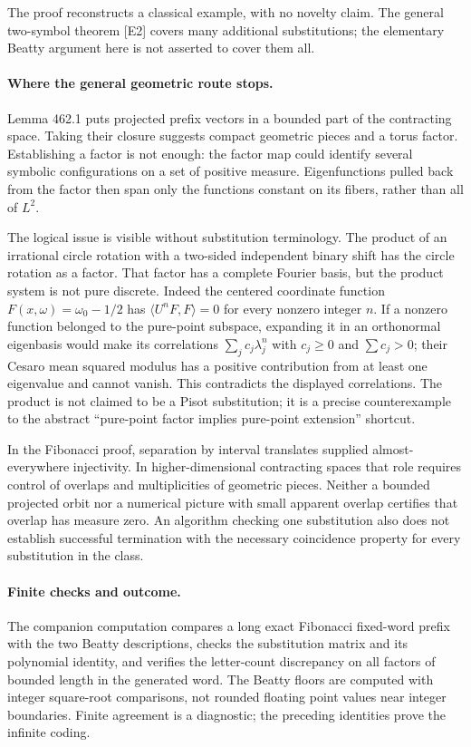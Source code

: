 \documentclass[11pt]{article}
\begin{document}
The proof reconstructs a classical example, with no novelty claim. The
general two-symbol theorem [E2] covers many additional substitutions;
the elementary Beatty argument here is not asserted to cover them all.

\paragraph{Where the general geometric route stops.}
Lemma 462.1 puts projected prefix vectors in a bounded part of the
contracting space. Taking their closure suggests compact geometric pieces
and a torus factor. Establishing a factor is not enough: the factor map
could identify several symbolic configurations on a set of positive
measure. Eigenfunctions pulled back from the factor then span only the
functions constant on its fibers, rather than all of $L^2$.

The logical issue is visible without substitution terminology. The product
of an irrational circle rotation with a two-sided independent binary shift
has the circle rotation as a factor. That factor has a complete Fourier
basis, but the product system is not pure discrete. Indeed the centered
coordinate function $F(x,\omega)=\omega_0-1/2$ has
$\langle U^nF,F\rangle=0$ for every nonzero integer $n$. If a nonzero
function belonged to the pure-point subspace, expanding it in an
orthonormal eigenbasis would make its correlations
$\sum_j c_j\lambda_j^n$ with $c_j\ge0$ and $\sum c_j>0$; their
Cesaro mean squared modulus has a positive contribution from at least
one eigenvalue and cannot vanish. This contradicts the displayed
correlations. The product is not claimed to be a Pisot substitution;
it is a precise counterexample to the abstract ``pure-point factor implies
pure-point extension'' shortcut.

In the Fibonacci proof, separation by interval translates supplied almost-everywhere
injectivity. In higher-dimensional contracting spaces that role requires
control of overlaps and multiplicities of geometric pieces. Neither a
bounded projected orbit nor a numerical picture with small apparent
overlap certifies that overlap has measure zero. An algorithm checking
one substitution also does not establish successful termination with the
necessary coincidence property for every substitution in the class.

\paragraph{Finite checks and outcome.}
The companion computation compares a long exact Fibonacci fixed-word
prefix with the two Beatty descriptions, checks the substitution matrix
and its polynomial identity, and verifies the letter-count discrepancy
on all factors of bounded length in the generated word. The Beatty floors
are computed with integer square-root comparisons, not rounded floating
point values near integer boundaries. Finite agreement is a diagnostic;
the preceding identities prove the infinite coding.
\end{document}
